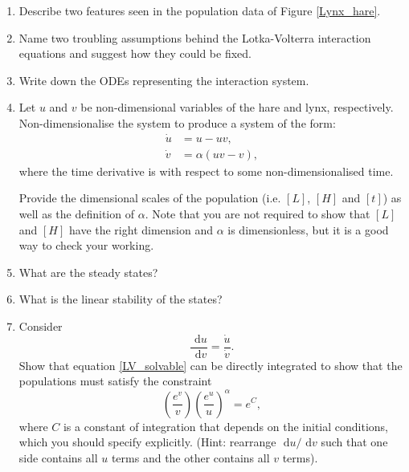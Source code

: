 \documentclass[]{article}
\newcommand{\bb}{\begin{equation}}
\newcommand{\ee}{\end{equation}}
\newcommand{\rd}{\text{ d}}
\newcommand{\fig}[1]{Figure \ref{#1}}
\newcommand{\eqn}[1]{equation \eqref{#1}}
\renewcommand{\l}{\left(}
\renewcommand{\r}{\right)}
\begin{document}
\begin{enumerate}
\item Describe two features seen in the population data of \fig{Lynx_hare}.
\item Name two troubling assumptions behind the Lotka-Volterra interaction equations and suggest how they could be fixed.
\item Write down the ODEs representing the interaction system.
\item Let $u$ and $v$ be non-dimensional variables of the hare and lynx, respectively. Non-dimensionalise the system to produce a system of the form:
\begin{align}
\dot{u}&=u-uv,\label{LV1}\\
\dot{v}&=\alpha(uv-v)\label{LV2},
\end{align}
where the time derivative is with respect to some non-dimensionalised time.

Provide the dimensional scales of the population (i.e. $[L]$, $[H]$ and $[t]$) as well as the definition of $\alpha$. Note that you are not required to show that $[L]$ and $[H]$ have the right dimension and $\alpha$ is dimensionless, but it is a good way to check your working.
\item What are the steady states?
\item What is the linear stability of the states?
\item Consider
\bb
\frac{\rd u}{\rd v}=\frac{\dot{u}}{\dot{v}}.\label{LV_solvable}
\ee
Show that \eqn{LV_solvable} can be directly integrated to show that the populations must satisfy the constraint
\bb
\l\frac{e^{v}}{v}\r\l\frac{e^{u}}{u}\r^\alpha=e^{C},\label{LV_conserved}
\ee
where $C$ is a constant of integration that depends on the initial conditions, which you should specify explicitly. (Hint: rearrange $\rd u/\rd v$ such that one side contains all $u$ terms and the other contains all $v$ terms).
\end{enumerate}
\end{document}
